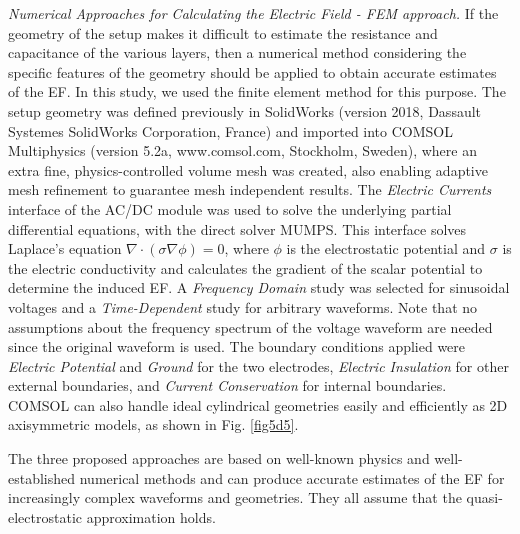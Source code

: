 \noindent \textit{Numerical Approaches for Calculating the Electric Field - \acs{FEM} approach.} If the geometry of the setup makes it difficult to estimate the resistance and capacitance of the various layers, then a numerical method considering the specific features of the geometry should be applied to obtain accurate estimates of the \acs{EF}. In this study, we used the finite element method for this purpose. The setup geometry was defined previously in SolidWorks (version 2018, Dassault Systemes SolidWorks Corporation, France) and imported into COMSOL Multiphysics (version 5.2a, www.comsol.com, Stockholm, Sweden), where an extra fine, physics-controlled volume mesh was created, also enabling adaptive mesh refinement to guarantee mesh independent results. The \textit{Electric Currents} interface of the AC/DC module was used to solve the underlying partial differential equations, with the direct solver \acs{MUMPS}. This interface solves Laplace’s equation $\nabla \cdot (\sigma \nabla \phi) = 0$, where $\phi$ is the electrostatic potential and $\sigma$ is the electric conductivity and calculates the gradient of the scalar potential to determine the induced \acs{EF}. A \textit{Frequency Domain} study was selected for sinusoidal voltages and a \textit{Time-Dependent} study for arbitrary waveforms. Note that no assumptions about the frequency spectrum of the voltage waveform are needed since the original waveform is used. The boundary conditions applied were \textit{Electric Potential} and \textit{Ground} for the two electrodes, \textit{Electric Insulation} for other external boundaries, and \textit{Current Conservation} for internal boundaries. COMSOL can also handle ideal cylindrical geometries easily and efficiently as 2D axisymmetric models, as shown in Fig. \ref{fig5d5}. 

The three proposed approaches are based on well-known physics and well-established numerical methods and can produce accurate estimates of the \acs{EF} for increasingly complex waveforms and geometries. They all assume that the quasi-electrostatic approximation holds. \hfill \break

